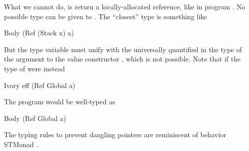 What we cannot do, is return a locally-allocated reference, like in program
.  No possible type can be given to .  The ``closest'' type is
something like
\begin{code}
Body (Ref (Stack x) a)
\end{code}
\noindent
But the type variable  must unify with the universally quantified
 in the type of the argument to the value constructor , which is
not possible.  Note that if the type of  were instead
\begin{code}
Ivory eff (Ref Global a)
\end{code}
\noindent
The program  would be well-typed as
\begin{code}
Body (Ref Global a)
\end{code}
\noindent
The typing rules to prevent dangling pointers are reminiscent of behavior STMonad~\cite{stmonad}.









